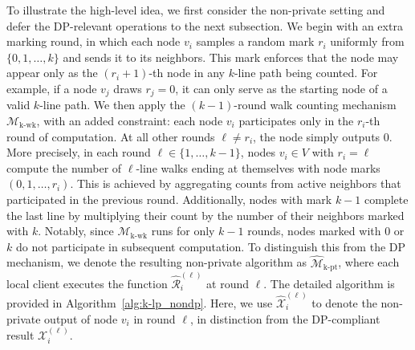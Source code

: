 To illustrate the high-level idea, we first consider the non-private setting and defer the DP-relevant operations to the next subsection.
We begin with an extra marking round, in which each node $v_i$ samples a random mark $r_i$ uniformly from $\{0, 1, \dots, k\}$ and sends it to its neighbors. 
This mark enforces that the node may appear only as the $(r_i + 1)$-th node in any $k$-line path being counted. 
For example, if a node $v_j$ draws $r_j = 0$, it can only serve as the starting node of a valid $k$-line path. 
We then apply the $(k-1)$-round walk counting mechanism $\mathcal{M}_{\mathrm{k\text{-}wk}}$, with an added constraint: each node $v_i$ participates only in the $r_i$-th round of computation.
At all other rounds $\ell \ne r_i$, the node simply outputs $0$.
More precisely, in each round $\ell \in \{1, \dots, k-1\}$, nodes $v_i \in V$ with $r_i = \ell$ compute the number of $\ell$-line walks ending at themselves with node marks $(0, 1, \dots, r_i)$.
This is achieved by aggregating counts from active neighbors that participated in the previous round.
Additionally, nodes with mark $k - 1$ complete the last line by multiplying their count by the number of their neighbors marked with $k$. 
Notably, since $\mathcal{M}_{\mathrm{k\text{-}wk}}$ runs for only $k-1$ rounds, nodes marked with $0$ or $k$ do not participate in subsequent computation. 
To distinguish this from the DP mechanism, we denote the resulting non-private algorithm as $\widehat{\mathcal{M}}_{\mathrm{k\text{-}pt}}$, where each local client executes the function $\widehat{\mathcal{R}}^{(\ell)}_i$ at round $\ell$. 
The detailed algorithm is provided in Algorithm~\ref{alg:k-lp_nondp}.
Here, we use $\widehat{\mathcal{X}}_i^{(\ell)}$ to denote the non-private output of node $v_i$ in round $\ell$, in distinction from the DP-compliant result ${\mathcal{X}}_i^{(\ell)}$.




